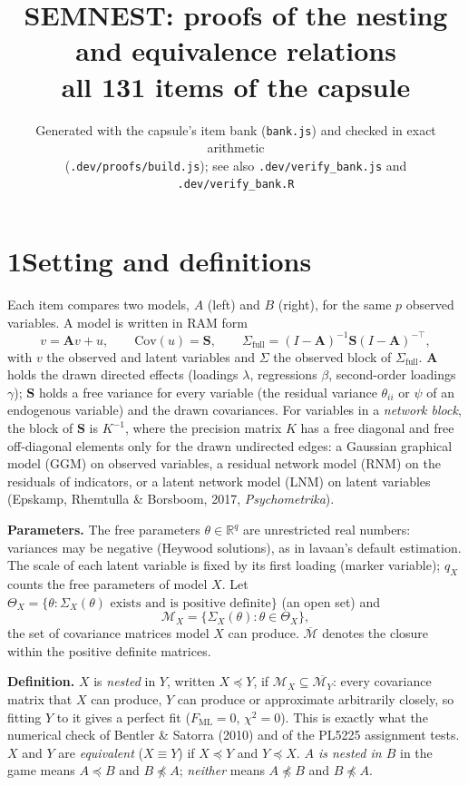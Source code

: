 \documentclass[10pt,a4paper]{article}
\title{SEMNEST: proofs of the nesting and equivalence relations\\[4pt]\large all 131 items of the capsule}
\author{Generated with the capsule's item bank (\texttt{bank.js}) and checked in exact arithmetic\\ (\texttt{.dev/proofs/build.js}); see also \texttt{.dev/verify\_bank.js} and \texttt{.dev/verify\_bank.R}}
\date{}
\newcommand{\nest}{\preceq}
\newcommand{\nnest}{\not\preceq}
\begin{document}
\maketitle

\section*{1\quad Setting and definitions}

Each item compares two models, $A$ (left) and $B$ (right), for the same $p$ observed variables. A model is written in RAM form
\[
v = \mathbf A v + u,\qquad \mathrm{Cov}(u)=\mathbf S,\qquad \Sigma_{\text{full}}=(I-\mathbf A)^{-1}\mathbf S(I-\mathbf A)^{-\top},
\]
with $v$ the observed and latent variables and $\Sigma$ the observed block of $\Sigma_{\text{full}}$. $\mathbf A$ holds the drawn directed effects (loadings $\lambda$, regressions $\beta$, second-order loadings $\gamma$); $\mathbf S$ holds a free variance for every variable (the residual variance $\theta_{ii}$ or $\psi$ of an endogenous variable) and the drawn covariances. For variables in a \emph{network block}, the block of $\mathbf S$ is $K^{-1}$, where the precision matrix $K$ has a free diagonal and free off-diagonal elements only for the drawn undirected edges: a Gaussian graphical model (GGM) on observed variables, a residual network model (RNM) on the residuals of indicators, or a latent network model (LNM) on latent variables (Epskamp, Rhemtulla \& Borsboom, 2017, \emph{Psychometrika}).

\textbf{Parameters.} The free parameters $\theta\in\mathbb R^{q}$ are unrestricted real numbers: variances may be negative (Heywood solutions), as in lavaan's default estimation. The scale of each latent variable is fixed by its first loading (marker variable); $q_X$ counts the free parameters of model $X$. Let $\Theta_X=\{\theta:\Sigma_X(\theta)\text{ exists and is positive definite}\}$ (an open set) and
\[
\mathcal M_X=\{\Sigma_X(\theta):\theta\in\Theta_X\},
\]
the set of covariance matrices model $X$ can produce. $\overline{\mathcal M}$ denotes the closure within the positive definite matrices.

\textbf{Definition.} $X$ is \emph{nested} in $Y$, written $X\nest Y$, if $\mathcal M_X\subseteq\overline{\mathcal M_Y}$: every covariance matrix that $X$ can produce, $Y$ can produce or approximate arbitrarily closely, so fitting $Y$ to it gives a perfect fit ($F_{\mathrm{ML}}=0$, $\chi^2=0$). This is exactly what the numerical check of Bentler \& Satorra (2010) and of the PL5225 assignment tests. $X$ and $Y$ are \emph{equivalent} ($X\equiv Y$) if $X\nest Y$ and $Y\nest X$. \emph{$A$ is nested in $B$} in the game means $A\nest B$ and $B\nnest A$; \emph{neither} means $A\nnest B$ and $B\nnest A$.
\end{document}
